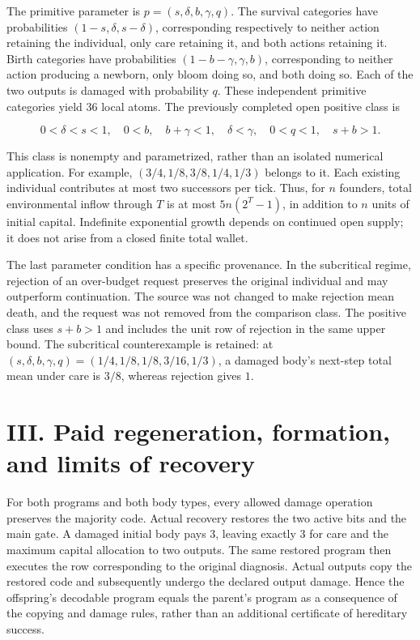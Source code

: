 \documentclass[
  english,
  11pt,
  oneside]{book}
\newcounter{none} %
\begin{document}
The primitive parameter is \(p=(s,\delta,b,\gamma,q)\). The survival categories have probabilities \((1-s,\delta,s-\delta)\), corresponding respectively to neither action retaining the individual, only care retaining it, and both actions retaining it. Birth categories have probabilities \((1-b-\gamma,\gamma,b)\), corresponding to neither action producing a newborn, only bloom doing so, and both doing so. Each of the two outputs is damaged with probability \(q\). These independent primitive categories yield 36 local atoms. The previously completed open positive class is

\[0<\delta<s<1,\quad 0<b,\quad b+\gamma<1,\quad
\delta<\gamma,\quad 0<q<1,\quad s+b>1.\]

This class is nonempty and parametrized, rather than an isolated numerical application. For example, \((3/4,1/8,3/8,1/4,1/3)\) belongs to it. Each existing individual contributes at most two successors per tick. Thus, for \(n\) founders, total environmental inflow through \(T\) is at most \(5n(2^T-1)\), in addition to \(n\) units of initial capital. Indefinite exponential growth depends on continued open supply; it does not arise from a closed finite total wallet.

The last parameter condition has a specific provenance. In the subcritical regime, rejection of an over-budget request preserves the original individual and may outperform continuation. The source was not changed to make rejection mean death, and the request was not removed from the comparison class. The positive class uses \(s+b>1\) and includes the unit row of rejection in the same upper bound. The subcritical counterexample is retained: at \((s,\delta,b,\gamma,q)=(1/4,1/8,1/8,3/16,1/3)\), a damaged body's next-step total mean under care is \(3/8\), whereas rejection gives \(1\).

\section{III. Paid regeneration, formation, and limits of recovery}\label{iii.-paid-regeneration-formation-and-limits-of-recovery}

For both programs and both body types, every allowed damage operation preserves the majority code. Actual recovery restores the two active bits and the main gate. A damaged initial body pays 3, leaving exactly 3 for care and the maximum capital allocation to two outputs. The same restored program then executes the row corresponding to the original diagnosis. Actual outputs copy the restored code and subsequently undergo the declared output damage. Hence the offspring's decodable program equals the parent's program as a consequence of the copying and damage rules, rather than an additional certificate of hereditary success.
\end{document}
